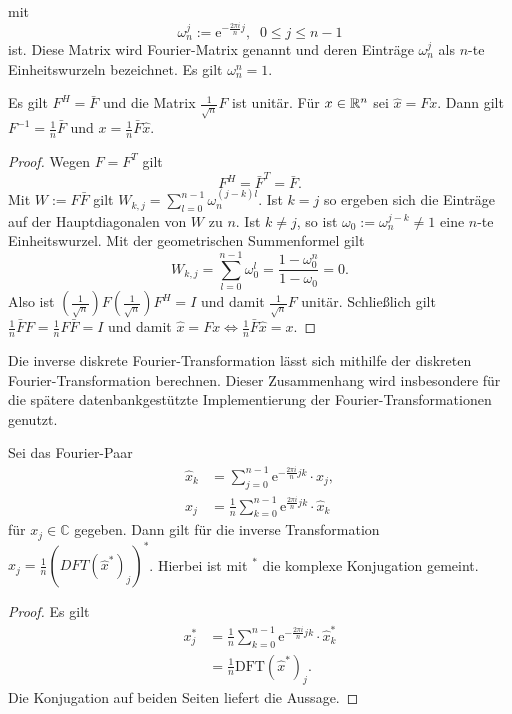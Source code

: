 mit 
\begin{equation*}
    \omega_n^{j}:=\mathrm{e}^{- \frac{2 \pi i}{n} j}, \; \; 0 \leq j \leq n-1
\end{equation*}
ist. Diese Matrix wird Fourier-Matrix genannt und deren Einträge $\omega_n^{j}$ als $n$-te Einheitswurzeln bezeichnet. Es gilt $\omega_n^n=1$.
\begin{lem}
    \label{lem:Finv}
    Es gilt $F^H=\bar{F}$ und die Matrix $\frac{1}{\sqrt{n}} F$ ist unitär. Für $x \in \mathbb{R}^n$ sei $\hat{x}=Fx$. Dann gilt $F^{-1}=\frac{1}{n} \bar{F}$ und $x= \frac{1}{n}\bar{F} \hat{x}$.
\end{lem}
\begin{proof}
    Wegen $F=F^T$ gilt 
    \begin{equation*}
        F^H=\bar{{F}}^T=\bar{F}.
    \end{equation*}
    Mit $W:=F\bar{F}$ gilt $W_{k,j}=\sum_{l=0}^{n-1} \omega_n^{(j-k)l}$. Ist $k=j$ so ergeben sich die Einträge auf der Hauptdiagonalen von $W$ zu $n$. Ist $k \neq j$, so ist $\omega_0:=\omega_n^{j-k} \neq 1$ eine $n$-te Einheitswurzel.
    Mit der geometrischen Summenformel gilt
    \begin{equation*}
        W_{k,j}=\sum_{l=0}^{n-1} \omega_0^l=\frac{1-\omega_0^n}{1-\omega_0}=0.
    \end{equation*} 
    Also ist $\left(\frac{1}{\sqrt{n}}\right) F\left(\frac{1}{\sqrt{n}}\right) F^H=I$ und damit $\frac{1}{\sqrt{n}} F$ unitär. Schließlich gilt $\frac{1}{n} \bar{F} F=\frac{1}{n} F \bar{F}= I$ und damit $\hat{x}=Fx \Leftrightarrow \frac{1}{n}\bar{F} \hat{x}=x$.
\end{proof} 
Die inverse diskrete Fourier-Transformation lässt sich mithilfe der diskreten Fourier-Transformation berechnen. Dieser Zusammenhang wird insbesondere für die spätere datenbankgestützte Implementierung der Fourier-Transformationen genutzt.
\begin{lem}
    \label{lem:inversedftasdft}
    Sei das Fourier-Paar
    \begin{align*}
        \hat{x}_k&=\sum_{j=0}^{n-1} \mathrm{e}^{- \frac{2 \pi i}{n} j k} \cdot x_j, \\ x_j&= \frac{1}{n} \sum_{k=0}^{n-1} \mathrm{e}^{\frac{2 \pi i}{n} j k} \cdot \hat{x}_k
    \end{align*}
    für $x_j \in \mathbb{C}$ gegeben. Dann gilt für die inverse Transformation $x_j=\frac{1}{n} (DFT(\hat{x}^*)_j)^*$. Hierbei ist mit ${}^*$ die komplexe Konjugation gemeint.
\end{lem}
\begin{proof}
  Es gilt
  \begin{align*}
    x_j^{*}&=\frac{1}{n} \sum_{k=0}^{n-1} \mathrm{e}^{-\frac{2 \pi i}{n} j k} \cdot \hat{x}^*_k \\
    &=\frac{1}{n} \mathrm{DFT}(\hat{x}^*)_j.
  \end{align*}
  Die Konjugation auf beiden Seiten liefert die Aussage.
\end{proof}
